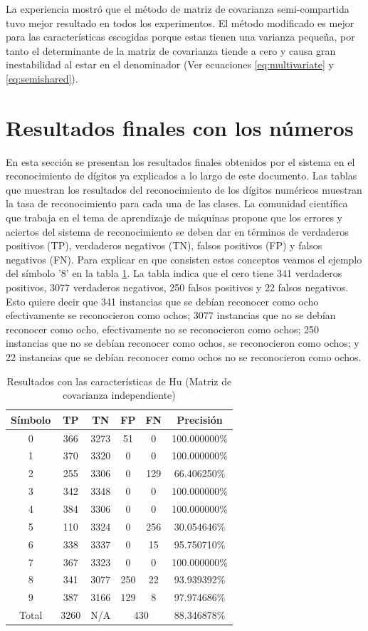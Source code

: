 \documentclass[a4paper, 11pt, oneside]{report}
\begin{document}
La experiencia mostró que el método de matriz de covarianza semi-compartida tuvo mejor resultado en todos los experimentos. El método modificado es mejor para las características escogidas porque estas tienen una varianza pequeña, por tanto el determinante de la matriz de covarianza tiende a cero y causa gran inestabilidad al estar en el denominador (Ver ecuaciones \ref{eq:multivariate} y \ref{eq:semishared}).

\section{Resultados finales con los números}
En esta sección se presentan los resultados finales obtenidos por el sistema en el reconocimiento de dígitos ya explicados a lo largo de este documento. Las tablas que muestran los resultados del reconocimiento de los dígitos numéricos muestran la tasa de reconocimiento para cada una de las clases. La comunidad científica que trabaja en el tema de aprendizaje de máquinas propone que los errores y aciertos del sistema de reconocimiento se deben dar en términos de verdaderos positivos (TP), verdaderos negativos (TN), falsos positivos (FP) y falsos negativos (FN). Para explicar en que consisten estos conceptos veamos el ejemplo del símbolo '8' en la tabla \ref{tb:numHuIndep}. La tabla indica que el cero tiene 341 verdaderos positivos, 3077 verdaderos negativos, 250 falsos positivos y 22 falsos negativos. Esto quiere decir que 341 instancias que se debían reconocer como ocho efectivamente se reconocieron como ochos; 3077 instancias que no se debían reconocer como ocho, efectivamente no se reconocieron como ochos; 250 instancias que no se debían reconocer como ochos, se reconocieron como ochos; y 22 instancias que se debían reconocer como ochos no se reconocieron como ochos.

\begin{table}
\centering
\begin{tabular}{|c|c|c|c|c|c|}
	\hline
	Símbolo & TP & TN & FP & FN & Precisión \\ 
	\hline
	0 & 366 & 3273 & 51 & 0 & 100.000000\% \\ 
	1 & 370 & 3320 & 0 & 0 & 100.000000\% \\ 
	2 & 255 & 3306 & 0 & 129 & 66.406250\% \\ 
	3 & 342 & 3348 & 0 & 0 & 100.000000\% \\ 
	4 & 384 & 3306 & 0 & 0 & 100.000000\% \\ 
	5 & 110 & 3324 & 0 & 256 & 30.054646\% \\ 
	6 & 338 & 3337 & 0 & 15 & 95.750710\% \\ 
	7 & 367 & 3323 & 0 & 0 & 100.000000\% \\ 
	8 & 341 & 3077 & 250 & 22 & 93.939392\% \\ 
	9 & 387 & 3166 & 129 & 8 & 97.974686\% \\ 
	\hline
	Total & 3260 & N/A & \multicolumn{2}{|c|}{430} & 88.346878\% \\
	\hline
\end{tabular}
\caption{Resultados con las características de Hu (Matriz de covarianza independiente)}
\label{tb:numHuIndep}
\end{table}
\end{document}
